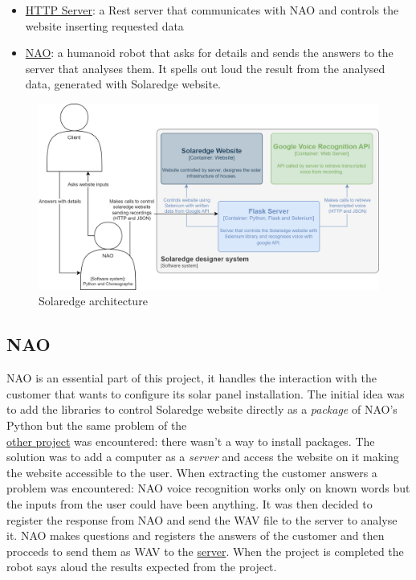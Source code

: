 \documentclass{optica-article}
\begin{document}
\begin{itemize}
    \item \hyperref[sec:solaedge_server]{HTTP Server}: a Rest server that communicates with NAO and controls the website inserting requested data
    \item \hyperref[sec:solaredge_nao]{NAO}: a humanoid robot that asks for details and sends the answers to the server that analyses them. It spells out loud the result from the analysed data, generated with Solaredge website.
\end{itemize}

\begin{figure}[!htbp]
    \centering
    \includegraphics[scale=0.23]{figures/architecture_solaredge.png}
    \caption{Solaredge architecture}
    \label{fig:architecture_solaredge}
\end{figure}

\subsection{NAO}\label{sec:solaredge_nao}
NAO is an essential part of this project, it handles the interaction with the customer that wants to configure its solar panel installation. The initial idea was to add the libraries to control Solaredge website directly as a \emph{package} of NAO's Python but the same problem of the \\\hyperref[sec:domotics_server]{other project} was encountered: there wasn't a way to install packages. The solution was to add a computer as a \emph{server} and access the website on it making the website accessible to the user. When extracting the customer answers a problem was encountered: NAO voice recognition works only on known words but the inputs from the user could have been anything. It was then decided to register the response from NAO and send the WAV file to the server to analyse it. NAO makes questions and registers the answers of the customer and then procceds to send them as WAV to the \hyperref[sec:solaedge_server]{server}. When the project is completed the robot says aloud the results expected from the project.
\end{document}

